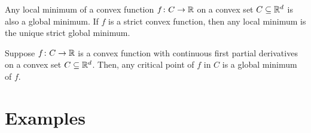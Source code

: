 \begin{theorem}\label{theorem:ConvexMinima}
Any local minimum of a convex function $f\colon C \to \mathbb{R}$ on a convex set $C \subseteq \mathbb{R}^d$ is also a global minimum.  If $f$ is a strict convex function, then any local minimum is the unique strict global minimum.
\end{theorem}

\begin{theorem}\label{theorem:ConvexCritical}
Suppose $f\colon C \to \mathbb{R}$ is a convex function with continuous first partial derivatives on a convex set $C \subseteq \mathbb{R}^d$.  Then, any critical point of $f$ in $C$ is a global minimum of $f$.
\end{theorem}

\section*{Examples}

